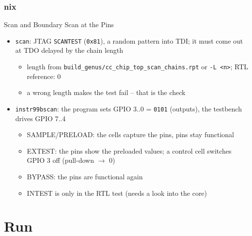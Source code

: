 \documentclass{beamer}
\newcommand{\astitle}{nix}
\newcommand{\assubtitle}{nix}
\newcommand{\cmd}[1]{\texttt{#1}}
\begin{document}
\renewcommand{\assubtitle}{Scan and Boundary Scan at the Pins}
\begin{frame}
\frametitle{\astitle}
\begin{block}{\assubtitle}
  \small
  \begin{itemize}
    \item \cmd{scan}: JTAG \cmd{SCANTEST} (\cmd{0x81}), a random pattern
      into TDI; it must come out at TDO delayed by the chain length
    \begin{itemize}
      \item length from \cmd{build\_genus/cc\_chip\_top\_scan\_chains.rpt}
        or \cmd{-L <n>}; RTL reference: 0
      \item a wrong length makes the test fail -- that is the check
    \end{itemize}
    \item \cmd{instr99bscan}: the program sets GPIO 3..0 = \cmd{0101}
      (outputs), the testbench drives GPIO 7..4
    \begin{itemize}
      \item SAMPLE/PRELOAD: the cells capture the pins, pins stay functional
      \item EXTEST: the pins show the preloaded values; a control cell
        switches GPIO 3 off (pull-down $\rightarrow$ 0)
      \item BYPASS: the pins are functional again
      \item INTEST is only in the RTL test (needs a look into the core)
    \end{itemize}
  \end{itemize}
\end{block}
\end{frame}

\section{Run}
\renewcommand{\astitle}{Run}
\end{document}
